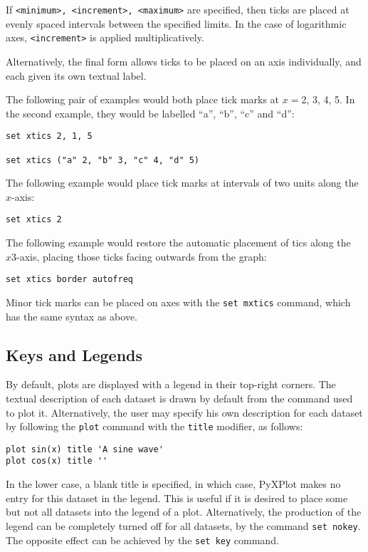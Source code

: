 \documentclass[a4paper,onecolumn,11pt]{book}
\begin{document}
If \texttt{<minimum>, <increment>, <maximum>} are specified, then ticks are
placed at evenly spaced intervals between the specified limits. In the case of
logarithmic axes, \texttt{<increment>} is applied multiplicatively.

Alternatively, the final form allows ticks to be placed on an axis
individually, and each given its own textual label.

The following pair of examples would both place tick marks at $x=$2, 3, 4, 5.
In the second example, they would be labelled ``a'', ``b'', ``c'' and ``d'':

\begin{verbatim}
set xtics 2, 1, 5

set xtics ("a" 2, "b" 3, "c" 4, "d" 5)
\end{verbatim}

The following example would place tick marks at intervals of two units along
the $x$-axis:

\begin{verbatim}
set xtics 2
\end{verbatim}

The following example would restore the automatic placement of tics along the
$x3$-axis, placing those ticks facing outwards from the graph:

\begin{verbatim}
set xtics border autofreq
\end{verbatim}

Minor tick marks can be placed on axes with the \texttt{set mxtics} command,
which has the same syntax as above.

\subsection{Keys and Legends}

By default, plots are displayed with a legend in their top-right corners. The
textual description of each dataset is drawn by default from the command used
to plot it. Alternatively, the user may specify his own description for each
dataset by following the \texttt{plot} command with the \texttt{title}
modifier, as follows:

\begin{verbatim}
plot sin(x) title 'A sine wave'
plot cos(x) title ''
\end{verbatim}

In the lower case, a blank title is specified, in which case, PyXPlot makes no
entry for this dataset in the legend. This is useful if it is desired to place
some but not all datasets into the legend of a plot.  Alternatively, the
production of the legend can be completely turned off for all datasets, by the
command \texttt{set nokey}. The opposite effect can be achieved by the
\texttt{set key} command.
\end{document}
